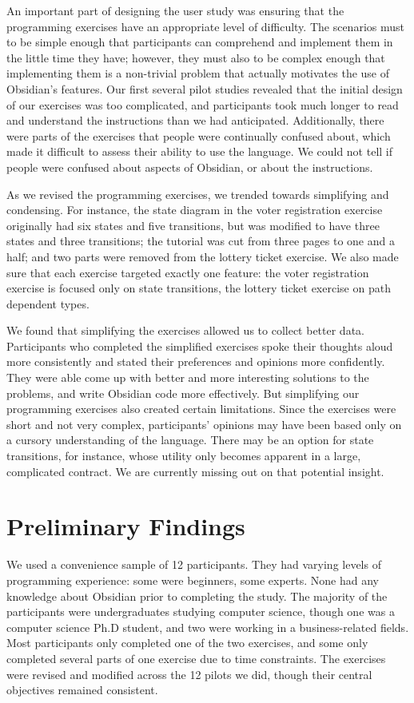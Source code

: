 \documentclass[sigplan,10pt,review]{acmart}\settopmatter{printfolios=true}
\begin{document}
An important part of designing the user study was ensuring that the programming exercises have an appropriate level of difficulty. The 
scenarios must to be simple enough that participants can comprehend and implement them in the little time they have; however, 
they must also to be complex enough that implementing them is a non-trivial problem that actually motivates the use of 
Obsidian's features. Our first several pilot studies revealed that the initial design of our exercises was too complicated, and 
participants took much longer to read and understand the instructions than we had anticipated. Additionally, there were parts 
of the exercises that people were continually confused about, which made it difficult to assess their ability to use the language. 
We could not tell if people were confused about aspects of Obsidian, or about the instructions. 

As we revised the programming exercises, we trended towards simplifying and condensing. For instance, the state diagram in 
the voter registration exercise originally had six states and five transitions, but was modified to have three states and three 
transitions; the tutorial was cut from three pages to one and a half; and two parts were removed from the lottery ticket exercise. 
We also made sure that each exercise targeted exactly one feature: the voter registration exercise is focused only on state 
transitions, the lottery ticket exercise on path dependent types. 

We found that simplifying the exercises allowed us to collect better data. Participants who completed the simplified exercises 
spoke their thoughts aloud more consistently and stated their preferences and opinions more confidently. They were able
come up with better and more interesting solutions to the problems, and write Obsidian code more effectively. 
But simplifying our programming exercises also created certain limitations. Since the exercises were short and not very 
complex, participants' opinions may have been based only on a cursory understanding of the language. There may be an option 
for state transitions, for instance, whose utility only becomes apparent in a large, complicated contract. We are currently missing 
out on that potential insight. 

\section{Preliminary Findings}

We used a convenience sample of 12 participants. They had varying levels of programming experience: some were beginners, some 
experts. None had any knowledge about Obsidian prior to completing the study. The majority of the participants were undergraduates 
studying computer science, though one was a computer science Ph.D student, and two were working in a business-related fields. Most 
participants only completed one of the two exercises, and some only completed several parts of one exercise due to time constraints. The 
exercises were revised and modified across the 12 pilots we did, though their central objectives remained consistent. 
\end{document}
